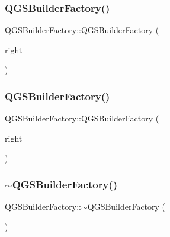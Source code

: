 \subsubsection{\texorpdfstring{Q\+G\+S\+Builder\+Factory()}{QGSBuilderFactory()}\hspace{0.1cm}{\footnotesize\ttfamily [2/3]}}
{\footnotesize\ttfamily Q\+G\+S\+Builder\+Factory\+::\+Q\+G\+S\+Builder\+Factory (\begin{DoxyParamCaption}\item[{const \mbox{\hyperlink{class_q_g_s_builder_factory}{Q\+G\+S\+Builder\+Factory}} \&}]{right }\end{DoxyParamCaption})\hspace{0.3cm}{\ttfamily [delete]}}

\mbox{\label{class_q_g_s_builder_factory_ad3e6b89b6d2779e2e156dc534b80234c}} 
\subsubsection{\texorpdfstring{Q\+G\+S\+Builder\+Factory()}{QGSBuilderFactory()}\hspace{0.1cm}{\footnotesize\ttfamily [3/3]}}
{\footnotesize\ttfamily Q\+G\+S\+Builder\+Factory\+::\+Q\+G\+S\+Builder\+Factory (\begin{DoxyParamCaption}\item[{\mbox{\hyperlink{class_q_g_s_builder_factory}{Q\+G\+S\+Builder\+Factory}} \&\&}]{right }\end{DoxyParamCaption})\hspace{0.3cm}{\ttfamily [delete]}}

\mbox{\label{class_q_g_s_builder_factory_ad7338089319bdbdb298ab11f4fd9b9f6}} 
\subsubsection{\texorpdfstring{$\sim$\+Q\+G\+S\+Builder\+Factory()}{~QGSBuilderFactory()}}
{\footnotesize\ttfamily Q\+G\+S\+Builder\+Factory\+::$\sim$\+Q\+G\+S\+Builder\+Factory (\begin{DoxyParamCaption}{ }\end{DoxyParamCaption})\hspace{0.3cm}{\ttfamily [virtual]}}




